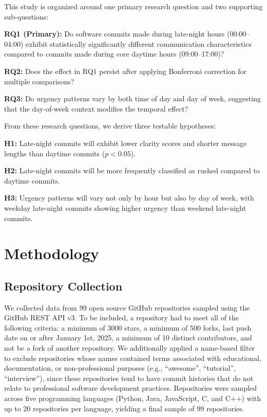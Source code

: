 \documentclass[sigconf]{acmart}
\begin{document}
This study is organized around one primary research question and two supporting sub-questions:

\medskip
\noindent\textbf{RQ1 (Primary):} Do software commits made during late-night hours (00:00--04:00) exhibit statistically significantly different communication characteristics compared to commits made during core daytime hours (09:00--17:00)?

\medskip
\noindent\textbf{RQ2:} Does the effect in RQ1 persist after applying Bonferroni correction for multiple comparisons?

\medskip
\noindent\textbf{RQ3:} Do urgency patterns vary by both time of day and day of week, suggesting that the day-of-week context modifies the temporal effect?

\medskip
From these research questions, we derive three testable hypotheses:

\medskip
\noindent\textbf{H1:} Late-night commits will exhibit lower clarity scores and shorter message lengths than daytime commits ($p < 0.05$).

\noindent\textbf{H2:} Late-night commits will be more frequently classified as rushed compared to daytime commits.

\noindent\textbf{H3:} Urgency patterns will vary not only by hour but also by day of week, with weekday late-night commits showing higher urgency than weekend late-night commits.

\section{Methodology}

\subsection{Repository Collection}

We collected data from 99 open source GitHub repositories sampled using the GitHub REST API v3. To be included, a repository had to meet all of the following criteria: a minimum of 3000 stars, a minimum of 500 forks, last push date on or after January 1st, 2025, a minimum of 10 distinct contributors, and not be a fork of another repository. We additionally applied a name-based filter to exclude repositories whose names contained terms associated with educational, documentation, or non-professional purposes (e.g., ``awesome'', ``tutorial'', ``interview''), since these repositories tend to have commit histories that do not relate to professional software development practices. Repositories were sampled across five programming languages (Python, Java, JavaScript, C, and C++) with up to 20 repositories per language, yielding a final sample of 99 repositories.
\end{document}
